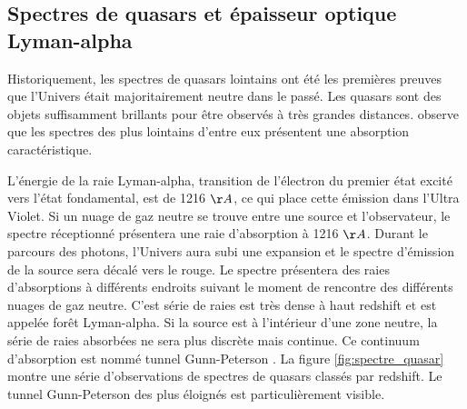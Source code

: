 
\subsection{Spectres de quasars et épaisseur optique Lyman-alpha}

Historiquement, les spectres de quasars lointains ont été les premières preuves que l'Univers était majoritairement neutre dans le passé.
Les quasars sont des objets suffisamment brillants pour être observés à très grandes distances.
\cite{1965ApJ...141.1295S} observe que les spectres des plus lointains d'entre eux présentent une absorption caractéristique.

L'énergie de la raie Lyman-alpha, transition de l'électron du premier état excité vers l’état fondamental, est de 1216 $\AA$, ce qui place cette émission dans l'Ultra Violet.
Si un nuage de gaz neutre se trouve entre une source et l'observateur, le spectre réceptionné présentera une raie d'absorption à 1216 $\AA$.
Durant le parcours des photons, l'Univers aura subi une expansion et le spectre d'émission de la source sera décalé vers le rouge.
Le spectre présentera des raies d’absorptions à différents endroits suivant le moment de rencontre des différents nuages de gaz neutre.
C'est série de raies est très dense à haut redshift et est appelée forêt Lyman-alpha.
Si la source est à l’intérieur d'une zone neutre, la série de raies absorbées ne sera plus discrète mais continue.
Ce continuum d’absorption est nommé tunnel Gunn-Peterson \citep{1965ApJ...141.1295S}.
La figure \ref{fig:spectre_quasar} montre une série d'observations de spectres de quasars classés par redshift.
Le tunnel Gunn-Peterson des plus éloignés est particulièrement visible.

